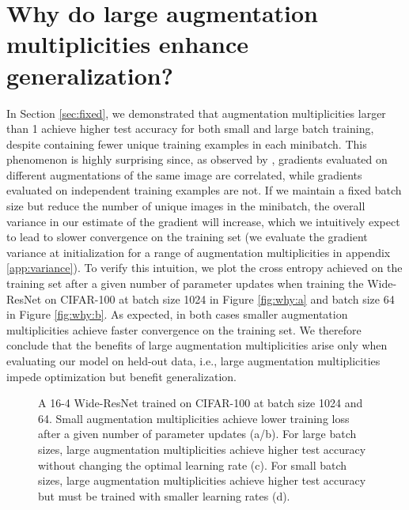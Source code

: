 \documentclass{article}
\begin{document}
\section{Why do large augmentation multiplicities enhance generalization?}
\label{sec:analysis}

In Section \ref{sec:fixed}, we demonstrated that augmentation multiplicities larger than 1 achieve higher test accuracy for both small and large batch training, despite containing fewer unique training examples in each minibatch. This phenomenon is highly surprising since, as observed by \citet{hoffer2019augment}, gradients evaluated on different augmentations of the same image are correlated, while gradients evaluated on independent training examples are not. If we maintain a fixed batch size but reduce the number of unique images in the minibatch, the overall variance in our estimate of the gradient will increase, which we intuitively expect to lead to slower convergence on the training set (we evaluate the gradient variance at initialization for a range of augmentation multiplicities in appendix \ref{app:variance}). To verify this intuition, we plot the cross entropy achieved on the training set after a given number of parameter updates when training the Wide-ResNet on CIFAR-100 at batch size 1024 in Figure \ref{fig:why:a} and batch size 64 in Figure \ref{fig:why:b}. As expected, in both cases smaller augmentation multiplicities achieve faster convergence on the training set. We therefore conclude that the benefits of large augmentation multiplicities arise only when evaluating our model on held-out data, i.e., large augmentation multiplicities impede optimization but benefit generalization.

\begin{figure}[t]
\centering
 \vskip -1mm
 \vskip -2mm
\caption{A 16-4 Wide-ResNet trained on CIFAR-100 at batch size 1024 and 64. Small augmentation multiplicities achieve lower training loss after a given number of parameter updates (a/b). For large batch sizes, large augmentation multiplicities achieve higher test accuracy without changing the optimal learning rate (c). For small batch sizes, large augmentation multiplicities  achieve higher test accuracy but must be trained with smaller learning rates (d). 
}
 \vskip -2mm
\end{figure}
\end{document}
